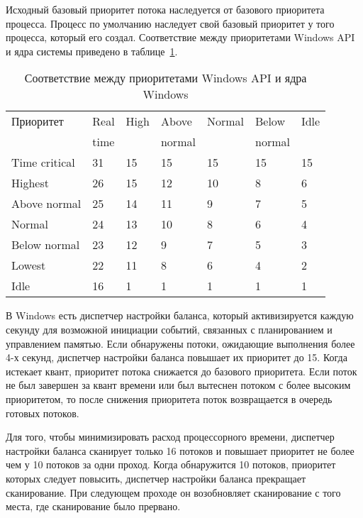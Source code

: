 \documentclass{bmstu}
\begin{document}
Исходный базовый приоритет потока наследуется от базового приоритета процесса. 
Процесс по умолчанию наследует свой базовый приоритет у того процесса, который его создал. 
Соответствие между приоритетами Windows API и ядра системы приведено в таблице~\ref{tab:windowsapi}.

\begin{table}[h]
\caption{Соответствие между приоритетами Windows API и ядра Windows}
\label{tab:windowsapi}
\begin{center}
\begin{tabular}{ | l | l | l | l | l | l | l |  }
\hline
Приоритет & Real & High & Above & Normal & Below & Idle \\
& time & & normal & & normal & \\ \hline
Time critical & 31 & 15 & 15 & 15 & 15 & 15 \\ \hline
Highest & 26 & 15 & 12 & 10 & 8 & 6 \\ \hline
Above normal & 25 & 14 & 11 & 9 & 7 & 5 \\ \hline
Normal & 24 & 13 & 10 & 8 & 6 & 4 \\ \hline
Below normal & 23 & 12 & 9 & 7 & 5 & 3 \\ \hline
Lowest  & 22 & 11 & 8 & 6 & 4 & 2 \\ \hline
Idle  & 16 & 1 & 1 & 1 & 1 & 1 \\ \hline
\end{tabular}
\end{center}
\end{table}

В Windows есть диспетчер настройки баланса, который активизируется каждую секунду для возможной инициации событий, связанных с планированием и управлением памятью. 
Если обнаружены потоки, ожидающие выполнения более 4-х секунд, диспетчер настройки баланса повышает их приоритет до 15. 
Когда истекает квант, приоритет потока снижается до базового приоритета. 
Если поток не был завершен за квант времени или был вытеснен потоком с более высоким приоритетом, то после снижения приоритета поток возвращается в очередь готовых потоков.

Для того, чтобы минимизировать расход процессорного времени, диспетчер настройки баланса сканирует только 16 потоков и повышает приоритет не более чем у 10 потоков за одни проход. 
Когда обнаружится 10 потоков, приоритет которых следует повысить, диспетчер настройки баланса прекращает сканирование. 
При следующем проходе он возобновляет сканирование с того места, где сканирование было прервано.
\end{document}
